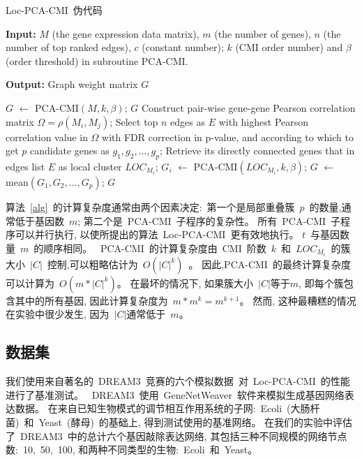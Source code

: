 \begin{algorithm}[!htbp]
    \caption{Loc-PCA-CMI~伪代码} %
    \label{alg}
    {\bf Input:} %
    $M$ (the gene expression data matrix), $m$ (the number of genes), $n$ (the number of top ranked edges), $c$ (constant number); $k$ (CMI order number) and $\beta$ (order threshold) in subroutine PCA-CMI.
    
    {\bf Output:} %
    Graph weight matrix $G$ 
    \begin{algorithmic}[1]
    \State $G$ $\leftarrow$ PCA-CMI$(M, k, \beta)$;
    \State \Return $G$
    \Else
    \State Construct pair-wise gene-gene Pearson correlation matrix $\Omega = \rho(M_i, M_j)$;
    \State Select top $n$ edges as $E$ with highest Pearson correlation value in $\Omega$ with FDR correction in p-value, and according to which to get 
    $p$ candidate genes as $g_1,g_2,...,g_{p}$;
      \State Retrieve its directly connected genes that in edges list $E$ as local cluster $LOC_{M_i}$;
    \EndFor
      \State $G_{i}$ $\leftarrow$ PCA-CMI$(LOC_{M_i}, k, \beta)$;
    \EndFor
    \State $G$ $\leftarrow$ mean$(G_{1},G_{2},...,G_{p})$;
    \State \Return $G$
    \EndIf
    \end{algorithmic}
\end{algorithm}

算法~\ref{alg}~的计算复杂度通常由两个因素决定:~第一个是局部重叠簇~$p$~的数量,通常低于基因数~$m$; 第二个是~PCA-CMI~子程序的复杂性。
所有~PCA-CMI~子程序可以并行执行, 以使所提出的算法~Loc-PCA-CMI~更有效地执行。
$t$~与基因数量~$m$~的顺序相同。
~PCA-CMI~的计算复杂度由~CMI~阶数~$k$~和~$LOC_{M_i}$~的簇大小~$|C|$~控制,可以粗略估计为~$O(|C|^k)$~。
因此,PCA-CMI~的最终计算复杂度可以计算为~$O(m *|C|^k)$。
在最坏的情况下, 如果簇大小~$|C|$等于$m$, 即每个簇包含其中的所有基因, 因此计算复杂度为~$m*m^k = m^{k+1}$。 
然而, 这种最糟糕的情况在实验中很少发生, 因为~$|C|$通常低于~$m$。

\subsection{数据集}

我们使用来自著名的~DREAM3~竞赛的六个模拟数据~\cite{schaffter2011genenetweaver}对~Loc-PCA-CMI~的性能进行了基准测试。
~DREAM3~使用~GeneNetWeaver~软件来模拟生成基因网络表达数据。
在来自已知生物模式的调节相互作用系统的子网:~Ecoli~(大肠杆菌)~和~Yeast~(酵母)~的基础上,
得到测试使用的基准网络。 
在我们的实验中评估了~DREAM3~中的总计六个基因敲除表达网络,
其包括三种不同规模的网络节点数:~10,~50,~100, 和两种不同类型的生物:~Ecoli~和~Yeast。

